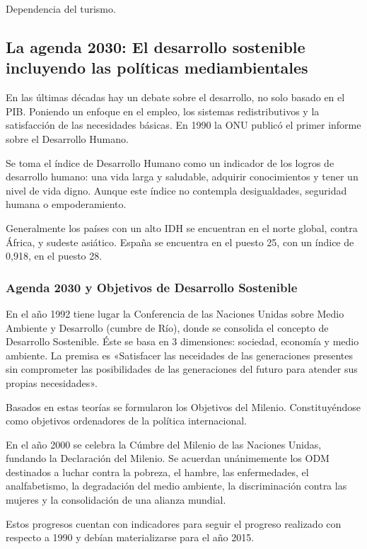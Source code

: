         Dependencia del turismo.
\subsection{La agenda 2030: El desarrollo sostenible incluyendo las políticas mediambientales} %
    En las últimas décadas hay un debate sobre el desarrollo, no solo basado en el PIB. Poniendo un enfoque en el empleo, los sistemas redistributivos y la satisfacción de las necesidades básicas. En 1990 la ONU publicó el primer informe sobre el Desarrollo Humano.

    Se toma el índice de Desarrollo Humano como un indicador de los logros de desarrollo humano: una vida larga y saludable, adquirir conocimientos y tener un nivel de vida digno. Aunque este índice no contempla desigualdades, seguridad humana o empoderamiento.

    Generalmente los países con un alto IDH se encuentran en el norte global, contra África, y sudeste asiático. España se encuentra en el puesto 25, con un índice de 0,918, en el puesto 28.

    \subsubsection{Agenda 2030 y Objetivos de Desarrollo Sostenible}
        En el año 1992 tiene lugar la Conferencia de las Naciones Unidas sobre Medio Ambiente y Desarrollo (cumbre de Río), donde se consolida el concepto de Desarrollo Sostenible. Éste se basa en 3 dimensiones: sociedad, economía y medio ambiente. La premisa es «Satisfacer las neceidades de las generaciones presentes sin comprometer las posibilidades de las generaciones del futuro para atender sus propias necesidades».

        Basados en estas teorías se formularon los Objetivos del Milenio. Constituyéndose como objetivos ordenadores de la política internacional.

        En el año 2000 se celebra la Cúmbre del Milenio de las Naciones Unidas, fundando la Declaración del Milenio. Se acuerdan unánimemente los ODM destinados a luchar contra la pobreza, el hambre, las enfermedades, el analfabetismo, la degradación del medio ambiente, la discriminación contra las mujeres y la consolidación de una alianza mundial.

        Estos progresos cuentan con indicadores para seguir el progreso realizado con respecto a 1990 y debían materializarse para el año 2015. %

